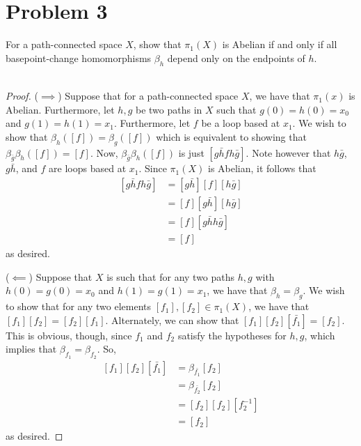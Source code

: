 \documentclass[fontsize=11pt]{scrartcl} %
\numberwithin{equation}{section} %
\numberwithin{figure}{section} %
\numberwithin{table}{section} %
\begin{document}
\section*{Problem 3}
For a path-connected space $X$, show that $\pi_1(X)$ is Abelian if and only if
all basepoint-change homomorphisms $\beta_h$ depend only on the endpoints of
$h$.
\\
\\
\begin{proof}
    ($\implies$)
    Suppose that for a path-connected space $X$, we have that $\pi_1(x)$ is
    Abelian. Furthermore, let $h,g$ be two paths in $X$ such that
    $g(0)=h(0)=x_0$ and $g(1)=h(1)=x_1$. Furthermore, let $f$ be a loop based at
    $x_1$. We wish to show that $\beta_h([f]) = \beta_g([f])$ which is equivalent to
    showing that $\beta_{\bar{g}}\beta_h([f]) = [f]$. Now,
    $\beta_{\bar{g}}\beta_h([f])$ is just $[g\bar{h}fh\bar{g}]$. Note however that
    $h\bar{g}$, $g\bar{h}$, and $f$ are loops based at $x_1$. Since $\pi_1(X)$ is
    Abelian, it follows that
    \[
        \begin{aligned}
            [g\bar{h}fh\bar{g}] &= [g\bar{h}][f][h\bar{g}]\\
            &=[f][g\bar{h}][h\bar{g}]\\
            &=[f][g\bar{h}h\bar{g}]\\
            &=[f]
        \end{aligned}
    \]
    as desired.

    ($\impliedby$)
    Suppose that $X$ is such that for any two paths $h,g$ with $h(0)=g(0)=x_0$
    and $h(1)=g(1)=x_1$, we have that $\beta_h = \beta_g$. We wish to show that
    for any two elements $[f_1],[f_2]\in \pi_1(X)$, we have that $[f_1][f_2] =
    [f_2][f_1]$. Alternately, we can show that $[f_1][f_2][\bar{f_1}]=[f_2]$.
    This is obvious, though, since $f_1$ and $f_2$ satisfy the hypotheses for
    $h,g$, which implies that $\beta_{f_1} = \beta_{f_2}$. So,
    \[
        \begin{aligned}
            [f_1][f_2][\bar{f_1}] &= \beta_{\bar{f_1}}[f_2]\\
            &= \beta_{\bar{f_2}}[f_2]\\
        &= [f_2][f_2][f_2^{-1}]\\
        &=[f_2]
        \end{aligned}
    \]
    as desired.
\end{proof}

\newpage
\end{document}
